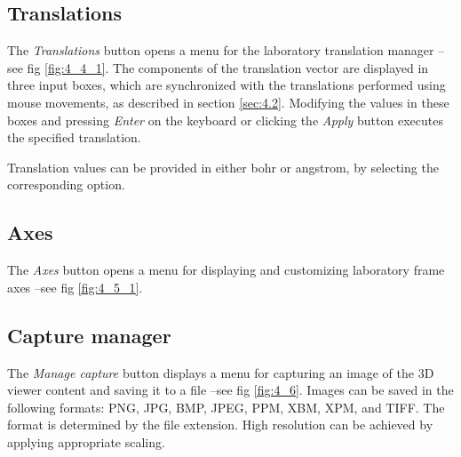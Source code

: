\documentclass[10pt]{article}
\begin{document}
\subsection{Translations \label{sec:4.4}}

The {\it Translations} button opens a menu for the laboratory translation manager --see fig \ref{fig:4_4_1}.  
The components of the translation vector are displayed in three input boxes,  
which are synchronized with the translations performed using mouse movements,  
as described in section \ref{sec:4.2}.  
Modifying the values in these boxes and pressing {\it Enter} on the keyboard  
or clicking the {\it Apply} button executes the specified translation.  

Translation values can be provided in either bohr or angstrom,  
by selecting the corresponding option.  


\subsection{Axes \label{sec:4.5}}

The {\it Axes} button opens a menu for displaying 
and customizing laboratory frame axes --see fig \ref{fig:4_5_1}. 


\subsection{Capture manager \label{sec:4.6}}

The {\it Manage capture} button displays a menu for capturing an image of the 3D viewer content  
and saving it to a file --see fig \ref{fig:4_6}.  
Images can be saved in the following formats: PNG, JPG, BMP, JPEG, PPM, XBM, XPM, and TIFF.  
The format is determined by the file extension.  
High resolution can be achieved by applying appropriate scaling.  
\end{document}
